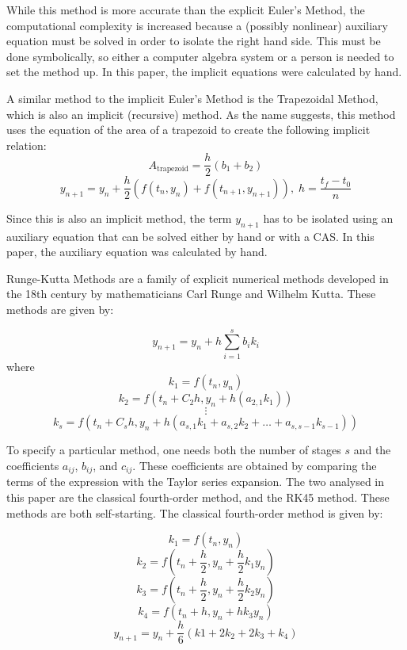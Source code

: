 \documentclass[11pt]{article}
\begin{document}
While this method is more accurate than the explicit Euler's Method, the computational
complexity is increased because a (possibly nonlinear) auxiliary equation must be
solved in order to isolate the right hand side. This must be done symbolically,
so either a computer algebra system or a person is needed to set the method up. In
this paper, the implicit equations were calculated by hand.

A similar method to the implicit Euler's Method is the Trapezoidal Method, which
is also an implicit (recursive) method. As the name suggests, this method uses the
equation of the area of a trapezoid to create the following implicit relation:
$$A_\mathrm{trapezoid}=\frac{h}{2}(b_{1}+b_{2})$$
$$y_{n+1}=y_{n}+\frac{h}{2}(f(t_{n}, y_{n})+f(t_{n+1}, y_{n+1})),\; h=\frac{t_f-t_0}{n}$$

Since this is also an implicit method, the term $y_{n+1}$ has to be isolated
using an auxiliary equation that can be solved either by hand or with a CAS.
In this paper, the auxiliary equation was calculated by hand.

Runge-Kutta Methods are a family of explicit numerical methods developed in the 18th
century by mathematicians Carl Runge and Wilhelm Kutta. These methods are given by:

$$y_{n+1}=y_{n}+h\sum_{i=1}^{s}b_{i}k_{i}$$
where
$$k_{1}=f(t_{n},y_{n})$$
$$k_{2}=f(t_{n}+C_{2}h,y_{n}+h(a_{2,1}k_{1}))$$
$$\vdots$$
$$k_{s}=f(t_{n}+C_{s}h,y_{n}+h(a_{s,1}k_{1}+a_{s,2}k_{2}+\dots+a_{s,s-1}k_{s-1}))$$

To specify a particular method, one needs both the number of stages $s$ and the
coefficients $a_{ij}$, $b_{ij}$, and $c_{ij}$. 
These coefficients are obtained by comparing the terms of the expression with the 
Taylor series expansion. The two
analysed in this paper are the classical fourth-order method, and the RK45 method.
These methods are both self-starting.
The classical fourth-order method is given by:

$$k_{1}=f(t_{n}, y_{n})$$
$$k_{2}=f\left(t_{n}+\frac{h}{2}, y_{n}+\frac{h}{2}k_{1}y_{n}\right)$$
$$k_{3}=f\left(t_{n}+\frac{h}{2}, y_{n}+\frac{h}{2}k_{2}y_{n}\right)$$
$$k_{4}=f(t_{n}+h, y_{n}+hk_{3}y_{n})$$
$$y_{n+1}=y_{n}+\frac{h}{6}(k{1}+2k_{2}+2k_{3}+k_{4})$$
\end{document}
